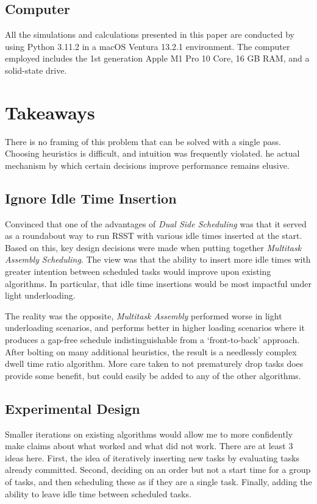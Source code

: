 \documentclass[conference]{IEEEtran}
\begin{document}
\subsection{Computer}

All the simulations and calculations presented in this paper are conducted by using Python 3.11.2 in a macOS Ventura 13.2.1 environment.
The computer employed includes the 1st generation Apple M1 Pro 10 Core, 16 GB RAM, and a solid-state drive.

\section{Takeaways}

There is no framing of this problem that can be solved with a single pass.
Choosing heuristics is difficult, and intuition was frequently violated.
he actual mechanism by which certain decisions improve performance remains elusive.

\subsection{Ignore Idle Time Insertion}

Convinced that one of the advantages of \emph{Dual Side Scheduling} was that it served as a roundabout way to run RSST with various idle times inserted at the start.
Based on this, key design decisions were made when putting together \emph{Multitask Assembly Scheduling}.
The view was that the ability to insert more idle times with greater intention between scheduled tasks would improve upon existing algorithms.
In particular, that idle time insertions would be most impactful under light underloading.

The reality was the opposite, \emph{Multitask Assembly} performed worse in light underloading scenarios, and performs better in higher loading scenarios where it produces a gap-free schedule indistinguishable from a `front-to-back' approach.
After bolting on many additional heuristics, the result is a needlessly complex dwell time ratio algorithm.
More care taken to not prematurely drop tasks does provide some benefit, but could easily be added to any of the other algorithms.

\subsection{Experimental Design}

Smaller iterations on existing algorithms would allow me to more confidently make claims about what worked and what did not work.
There are at least 3 ideas here.
First, the idea of iteratively inserting new tasks by evaluating tasks already committed.
Second, deciding on an order but not a start time for a group of tasks, and then scheduling these as if they are a single task.
Finally, adding the ability to leave idle time between scheduled tasks.
\end{document}
